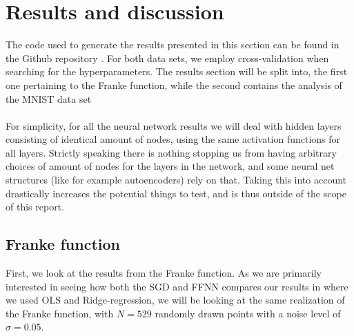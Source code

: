 \documentclass[a4paper]{article}
\newcommand\red[1]{\textcolor{red}{\textbf{#1}}}
\begin{document}
\section{Results and discussion} \label{chap:results}
The code used to generate the results presented in this section can be found in the Github repository \cite{Github2}. For both data sets, we employ cross-validation when searching for the hyperparameters. The results section will be split into, the first one pertaining to the Franke function, while the second contains the analysis of the MNIST data set
\\\\
For simplicity, for all the neural network results we will deal with hidden layers consisting of identical amount of nodes, using the same activation functions for all layers. Strictly speaking there is nothing stopping us from having arbitrary choices of amount of nodes for the layers in the network, and some neural net structures (like for example autoencoders) rely on that. Taking this into account drastically increases the potential things to test, and is thus outside of the scope of this report.

\subsection{Franke function}
First, we look at the results from the Franke function. As we are primarily interested in seeing how both the SGD and FFNN compares our results in \cite{Github1} where we used OLS and Ridge-regression, we will be looking at the same realization of the Franke function, with $N=529$ randomly drawn points with a noise level of $\sigma=0.05$.
\end{document}
